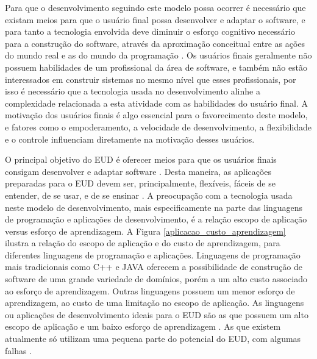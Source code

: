 Para que o desenvolvimento seguindo este modelo possa ocorrer é necessário que existam meios para que o usuário final possa desenvolver e adaptar o software, e para tanto a tecnologia envolvida deve diminuir o esforço cognitivo necessário para a construção do software, através da aproximação conceitual entre as ações do mundo real e as do mundo da programação \cite{fischer2004}. Os usuários finais geralmente não possuem habilidades de um profissional da área de software, e também não estão interessados em construir sistemas no mesmo nível que esses profissionais, por isso é necessário que a tecnologia usada no desenvolvimento alinhe a complexidade relacionada a esta atividade com as habilidades do usuário final. A motivação dos usuários finais é algo essencial para o favorecimento deste modelo, e fatores como o empoderamento, a velocidade de desenvolvimento, a flexibilidade e o controle influenciam diretamente na motivação desses usuários.

O principal objetivo do EUD é oferecer meios para que os usuários finais consigam desenvolver e adaptar software \cite{lieberman2006}. Desta maneira, as aplicações preparadas para o EUD devem ser, principalmente, flexíveis, fáceis de se entender, de se usar, e de se ensinar \cite{lieberman2006}. A preocupação com a tecnologia usada neste modelo de desenvolvimento, mais especificamente na parte das linguagens de programação e aplicações de desenvolvimento, é a relação escopo de aplicação versus esforço de aprendizagem. A Figura \ref{aplicacao_custo_aprendizagem} ilustra a relação do escopo de aplicação e do custo de aprendizagem, para diferentes linguagens de programação e aplicações. Linguagens de programação mais tradicionais como C++ e JAVA oferecem a possibilidade de construção de software de uma grande variedade de domínios, porém a um alto custo associado ao esforço de aprendizagem. Outras linguagens possuem um menor esforço de aprendizagem, ao custo de uma limitação no escopo de aplicação. As linguagens ou aplicações de desenvolvimento ideais para o EUD são as que possuem um alto escopo de aplicação e um baixo esforço de aprendizagem \cite{fischer2004}. As que existem atualmente só utilizam uma pequena parte do potencial do EUD, com algumas falhas \cite{paterno2013}.

